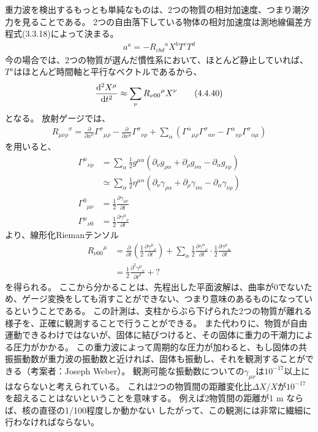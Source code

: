 \documentclass[a4paper]{jsarticle}
\newcommand{\dif}[2]{\frac{{\rm d} #1}{{\rm d} #2}}
\newcommand{\pdif}[2]{\frac{\partial #1}{\partial #2}}
\begin{document}
重力波を検出するもっとも単純なものは、2つの物質の相対加速度、つまり潮汐力を見ることである。
2つの自由落下している物体の相対加速度は測地線偏差方程式(3.3.18)によって決まる。
\begin{align}
	a^{a} = -{R_{cbd}}^a X^b T^c T^d \tag{3.3.18}
\end{align}
今の場合では、2つの物質が選んだ慣性系において、ほとんど静止していれば、$T^a$はほとんど時間軸と平行なベクトルであるから、
\begin{align}
	\dif{^2 X^{\mu}}{t^2} \approx \sum_{\nu} {R_{\nu00}}^{\mu} X^{\nu} \tag{4.4.40}
\end{align}
となる。
放射ゲージでは、
\begin{align}
	{R_{\mu\nu\rho}}^{\sigma} = \pdif{}{x^{\nu}} {\Gamma^{\sigma}}_{\mu\rho} - \pdif{}{x^{\mu}} {\Gamma^{\sigma}}_{\nu\rho} + \sum_{\alpha} \left( {\Gamma^{\alpha}}_{\mu\rho} {\Gamma^{\sigma}}_{\alpha\nu} - {\Gamma^{\alpha}}_{\nu\rho} {\Gamma^{\sigma}}_{\alpha\mu} \right) \tag{3.4.4}
\end{align}
を用いると、
\begin{align}
	{\Gamma^{\mu}}_{\nu\rho} &= \sum_{\alpha} \frac{1}{2} g^{\mu\alpha} \left( \partial_{\nu} g_{\rho\alpha} + \partial_{\rho} g_{\nu\alpha} - \partial_{\alpha} g_{\nu\rho} \right) \\
	&\simeq \sum_{\alpha} \frac{1}{2} \eta^{\mu\alpha} \left( \partial_{\nu} \gamma_{\rho\alpha} + \partial_{\rho} \gamma_{\nu\alpha} - \partial_{\alpha} \gamma_{\nu\rho} \right) \\
	{\Gamma^0}_{\mu\nu} &= \frac{1}{2} \pdif{\gamma_{\mu\nu}}{t} \\
	{\Gamma^{\mu}}_{\nu 0} &= \frac{1}{2} \pdif{{\gamma^{\mu}}_{\nu}}{t}
\end{align}
より、線形化Riemanテンソル
\begin{align}
	{R_{\nu 00}}^{\mu} &= \pdif{}{t} \left( \frac{1}{2} \pdif{{\gamma^{\mu}}_{\nu}}{t} \right) + \sum_{\alpha} \frac{1}{2} \pdif{{\gamma^{\alpha}}_{\nu}}{t} \cdot \frac{1}{2} \pdif{{\gamma^{\mu}}_{\alpha}}{t} \\
	&= \frac{1}{2} \pdif{^2 {\gamma^{\mu}}_{\nu}}{t^2} + ?
\end{align}
を得られる。
ここから分かることは、先程出した平面波解は、曲率が0でないため、ゲージ変換をしても消すことができない、つまり意味のあるものになっているということである。
この計測は、支柱からぶら下げられた2つの物質が離れる様子を、正確に観測することで行うことができる。
また代わりに、物質が自由運動できるわけではないが、固体に結びつけると、その固体に重力の干潮力による圧力がかかる。
この重力波によって周期的な圧力が加わると、もし固体の共振振動数が重力波の振動数と近ければ、固体も振動し、それを観測することができる（考案者：Joseph Weber）。
観測可能な振動数についての$\gamma_{\mu\nu}$は$10^{-17}$以上にはならないと考えられている。
これは2つの物質間の距離変化比$\Delta X /X$が$10^{-17}$を超えることはないということを意味する。
例えば2物質間の距離が1 m ならば、核の直径の1/100程度しか動かない
したがって、この観測には非常に繊細に行わなければならない。
\end{document}

